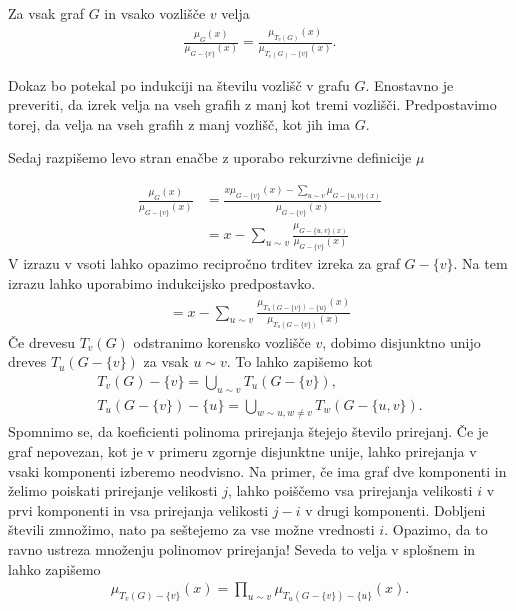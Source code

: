 \begin{lema}\label{lemarekurzpathdrevesa}
    Za vsak graf \(G\) in vsako vozlišče \(v\) velja
    \begin{align*}
        \frac{\mu_G(x)}{\mu_{G-\{v\}}(x)} = \frac{\mu_{T_v(G)}(x)}{\mu_{T_v(G)-\{v\}}(x)}.
    \end{align*}
\end{lema}
\begin{dokaz}
    Dokaz bo potekal po indukciji na številu vozlišč v grafu \(G\). Enostavno je preveriti, da izrek velja na vseh grafih z manj kot tremi vozlišči. Predpostavimo torej, da velja na vseh grafih z manj vozlišč, kot jih ima \(G\).

    Sedaj razpišemo levo stran enačbe z uporabo rekurzivne definicije \(\mu\)

    \begin{align*}
        \frac{\mu_G(x)}{\mu_{G-\{v\}}(x)} & = \frac{x \mu_{G-\{v\}}(x) - \sum_{u\sim v}\mu_{G-\{u, v\}(x)}}{\mu_{G-\{v\}}(x)} \\
                                          & = x - \sum_{u\sim v}\frac{\mu_{G-\{u, v\}(x)}}{\mu_{G-\{v\}}(x)}
    \end{align*}
    V izrazu v vsoti lahko opazimo recipročno trditev izreka za graf \(G-\{v\}\). Na tem izrazu lahko uporabimo indukcijsko predpostavko.
    \begin{align}\label{lemamatching}
        = x - \sum_{u\sim v}\frac{\mu_{T_u(G-\{v\}) - \{u\}}(x)}{\mu_{T_u(G-\{v\})}(x)}
    \end{align}
    Če drevesu \(T_v(G)\) odstranimo korensko vozlišče \(v\), dobimo disjunktno unijo dreves \(T_u(G-\{v\})\) za vsak \(u\sim v\). To lahko zapišemo kot
    \begin{align*}
        T_v(G) - \{v\} = \bigcup_{u\sim v} T_u(G-\{v\}), \\
        T_u(G - \{v\}) - \{u\} = \bigcup_{w\sim u, w\neq v} T_w(G-\{u, v\}).
    \end{align*}
    Spomnimo se, da koeficienti polinoma prirejanja štejejo število prirejanj. Če je graf nepovezan, kot je v primeru zgornje disjunktne unije, lahko prirejanja v vsaki komponenti izberemo neodvisno. Na primer, če ima graf dve komponenti in želimo poiskati prirejanje velikosti \(j\), lahko poiščemo vsa prirejanja velikosti \(i\) v prvi komponenti in vsa prirejanja velikosti \(j-i\) v drugi komponenti. Dobljeni števili zmnožimo, nato pa seštejemo za vse možne vrednosti \(i\). Opazimo, da to ravno ustreza množenju polinomov prirejanja! Seveda to velja v splošnem in lahko zapišemo
    \begin{align*}
        \mu_{T_v(G) - \{v\}}(x) = \prod_{u\sim v} \mu_{T_u(G-\{v\}) - \{u\}}(x).
    \end{align*}


\end{dokaz}
